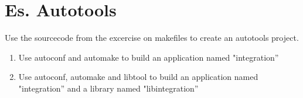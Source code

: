 \section*{Es. Autotools}

Use the sourcecode from the excercise on makefiles to create an autotools project.
\begin{enumerate}
  \item Use autoconf and automake to build an application named "integration''
  \item Use autoconf, automake and libtool to build an application named "integration'' and a library named "libintegration''
\end{enumerate}




